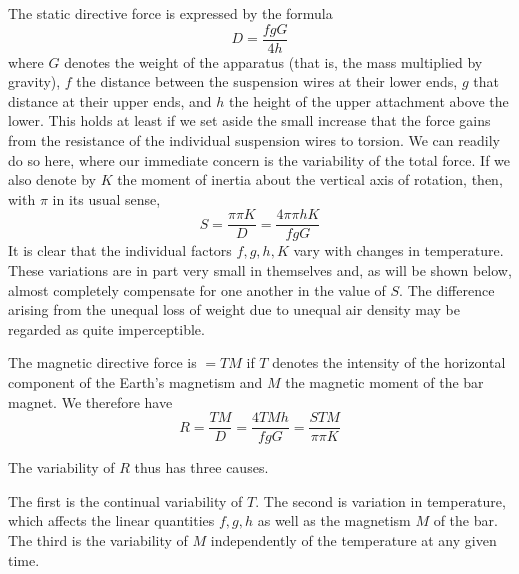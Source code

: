 The static directive force is expressed by the formula
\[
D=\frac{fgG}{4h}
\]
where $G$ denotes the weight of the apparatus (that is, the mass multiplied by gravity), $f$ the distance between the suspension wires at their lower ends, $g$ that distance at their upper ends, and $h$ the height of the upper attachment above the lower. This holds at least if we set aside the small increase that the force gains from the resistance of the individual suspension wires to torsion. We can readily do so here, where our immediate concern is the variability of the total force. If we also denote by $K$ the moment of inertia about the vertical axis of rotation, then, with $\pi$ in its usual sense,
\[
S=\frac{\pi\pi K}{D}=\frac{4\pi\pi hK}{fgG}
\]
It is clear that the individual factors $f,g,h,K$ vary with changes in temperature. These variations are in part very small in themselves and, as will be shown below, almost completely compensate for one another in the value of $S$. The difference arising from the unequal loss of weight due to unequal air density may be regarded as quite imperceptible.

The magnetic directive force is $=TM$ if $T$ denotes the intensity of the horizontal component of the Earth’s magnetism and $M$ the magnetic moment of the bar magnet. We therefore have
\[
R=\frac{TM}{D}=\frac{4TMh}{fgG}=\frac{STM}{\pi\pi K}
\]

The variability of $R$ thus has three causes.

The first is the continual variability of $T$. The second is variation in temperature, which affects the linear quantities $f,g,h$ as well as the magnetism $M$ of the bar. The third is the variability of $M$ independently of the temperature at any given time.

